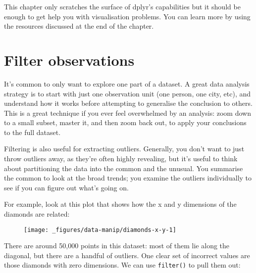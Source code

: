This chapter only scratches the surface of dplyr's capabilities but it
should be enough to get help you with visualisation problems. You can
learn more by using the resources discussed at the end of the chapter.

\section{Filter observations}

It's common to only want to explore one part of a dataset. A great data
analysis strategy is to start with just one observation unit (one
person, one city, etc), and understand how it works before attempting to
generalise the conclusion to others. This is a great technique if you
ever feel overwhelmed by an analysis: zoom down to a small subset,
master it, and then zoom back out, to apply your conclusions to the full
dataset. 

Filtering is also useful for extracting outliers. Generally, you don't
want to just throw outliers away, as they're often highly revealing, but
it's useful to think about partitioning the data into the common and the
unusual. You summarise the common to look at the broad trends; you
examine the outliers individually to see if you can figure out what's
going on.

For example, look at this plot that shows how the x and y dimensions of
the diamonds are related:

\begin{Shaded}
\begin{Highlighting}[]
\StringTok{ }
\StringTok{  }\NormalTok{()}
\end{Highlighting}
\end{Shaded}

\begin{figure}[H]
  \centering
  \texttt{[image: \_figures/data-manip/diamonds-x-y-1]}
\end{figure}

There are around 50,000 points in this dataset: most of them lie along
the diagonal, but there are a handful of outliers. One clear set of
incorrect values are those diamonds with zero dimensions. We can use
\texttt{filter()} to pull them out:

